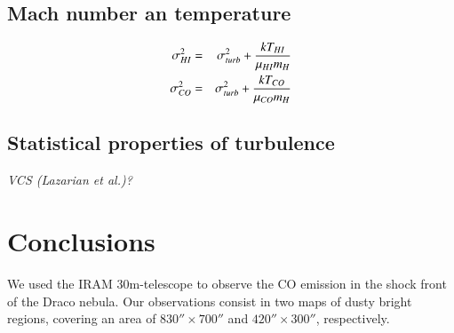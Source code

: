 \documentclass[traditabstract]{aa}
\begin{document}
   \subsection{Mach number an temperature}

\begin{eqnarray}
  \sigma_{H\rmnum{1}}^2 &=& \sigma_{turb}^2+\frac{k T_{H\rmnum{1}}}{\mu_{H\rmnum{1}} m_H} \\
  \sigma_{CO}^2         &=& \sigma_{turb}^2+\frac{k T_{CO}}{\mu_{CO} m_H}
\end{eqnarray}


   \subsection{Statistical properties of turbulence}
   \textit{VCS (Lazarian et al.)?}




\section{Conclusions}
\label{sec:conclusion}

   We used the IRAM 30m-telescope to observe the CO emission in the shock front of the Draco nebula. Our observations consist in two maps of dusty bright regions, covering an area of $830''\times 700''$ and $420''\times 300''$, respectively.
\end{document}
